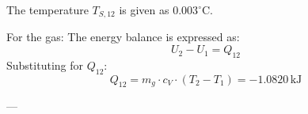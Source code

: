 The temperature \( T_{S,12} \) is given as \( 0.003^\circ\text{C} \).  

For the gas:  
The energy balance is expressed as:  
\[
U_2 - U_1 = Q_{12}
\]  
Substituting for \( Q_{12} \):  
\[
Q_{12} = m_g \cdot c_V \cdot (T_2 - T_1) = -1.0820 \, \text{kJ}
\]  

---